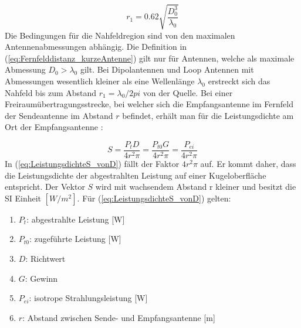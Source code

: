 \begin{equation}
r_{1}=0.62\sqrt{\dfrac{D_{0}^{3}}{\lambda_{0}}} \label{eq:Fernfelddistanz_kurzeAntenne}
\end{equation}
Die Bedingungen für die Nahfeldregion sind von den maximalen Antennenabmessungen abhängig. Die Definition in (\ref{eq:Fernfelddistanz_kurzeAntenne}) gilt nur für Antennen, welche als maximale Abmessung $D_{0}>\lambda_{0}$ gilt.
Bei Dipolantennen und Loop Antennen mit Abmessungen wesentlich kleiner als eine Wellenlänge $\lambda_{0}$ erstreckt sich das Nahfeld bis zum Abstand $r_{1}=\lambda_{0}/2pi$ von der Quelle. Bei einer Freiraumübertragungsstrecke, bei welcher sich die Empfangsantenne im Fernfeld der Sendeantenne im Abstand $r$ befindet, erhält man für die Leistungsdichte am Ort der Empfangsantenne \cite{meinke1992taschenbuch}:

\begin{equation}
S=\dfrac{P_{t}D}{4r^{2}\pi} = \dfrac{P_{t0}G}{4r^{2}\pi}=\dfrac{P_{ei}}{4r^{2}\pi}\label{eq:LeistungsdichteS_vonD}
\end{equation}
In (\ref{eq:LeistungsdichteS_vonD}) fällt der Faktor $4r^{2}\pi$ auf. Er kommt daher, dass die Leistungsdichte der abgestrahlten Leistung auf einer Kugeloberfläche entspricht. Der Vektor $S$ wird mit wachsendem Abstand r kleiner und besitzt die SI Einheit $[W/m^{2}]$. Für (\ref {eq:LeistungsdichteS_vonD}) gelten:
\begin{enumerate}[leftmargin=2cm]
  \item[] $P_t$: abgestrahlte Leistung [W]
  \item[] $P_{t0}$: zugeführte Leistung [W]
	\item[] $D$: Richtwert 
  \item[] $G$: Gewinn 
  \item[] $P_{ei}$: isotrope Strahlungsleistung [W] 
  \item[] $r$: Abstand zwischen Sende- und Empfangsantenne [m]
\end{enumerate} 





